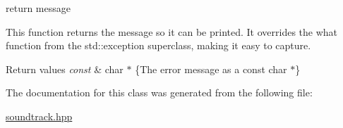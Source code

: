 return message 

This function returns the message so it can be printed. It overrides the what function from the std\+::exception superclass, making it easy to capture.


\begin{DoxyRetVals}{Return values}
{\em const} & char $\ast$ \{The error message as a const char $\ast$\} \\
\hline
\end{DoxyRetVals}


The documentation for this class was generated from the following file\+:\begin{DoxyCompactItemize}
\item 
\hyperlink{soundtrack_8hpp}{soundtrack.\+hpp}\end{DoxyCompactItemize}
